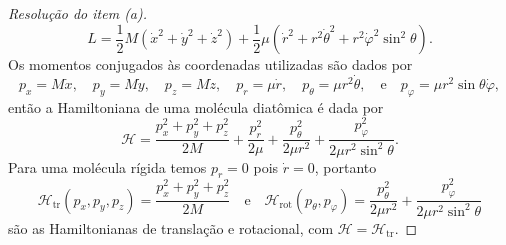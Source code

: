 \begin{proof}[Resolução do item (a)]
    \begin{equation*}
        L = \frac12 M\left(\dot{x}^2 + \dot{y}^2 + \dot{z}^2\right) + \frac12 \mu \left(\dot{r}^2 + r^2\dot{\theta}^2 + r^2\dot{\varphi}^2\sin^2\theta\right).
    \end{equation*}
    Os momentos conjugados às coordenadas utilizadas são dados por
    \begin{equation*}
        p_x = M \dot{x},\quad
        p_y = M \dot{y},\quad
        p_z = M \dot{z},\quad
        p_r = \mu \dot{r},\quad
        p_\theta = \mu r^2\dot{\theta},\quad\text{e}\quad
        p_{\varphi} = \mu r^2 \sin\theta\dot{\varphi},
    \end{equation*}
    então a Hamiltoniana de uma molécula diatômica é dada por
    \begin{equation*}
        \mathcal{H} = \frac{p_x^2 + p_y^2 + p_z^2}{2M} + \frac{p_r^2}{2\mu} + \frac{p_\theta^2}{2\mu r^2} + \frac{p_\varphi^2}{2\mu r^2 \sin^2\theta}.
    \end{equation*}
    Para uma molécula rígida temos \(p_r = 0\) pois \(\dot{r} = 0\), portanto
    \begin{equation*}
        \mathcal{H}_{\mathrm{tr}}(p_x, p_y, p_z) = \frac{p_x^2 + p_y^2 + p_z^2}{2M}
        \quad\text{e}\quad
        \mathcal{H}_{\mathrm{rot}}(p_\theta, p_\varphi) = \frac{p_\theta^2}{2\mu r^2} + \frac{p_\varphi^2}{2\mu r^2 \sin^2\theta}
    \end{equation*}
    são as Hamiltonianas de translação e rotacional, com \(\mathcal{H} = \mathcal{H}_{\mathrm{tr}}\).


\end{proof}
